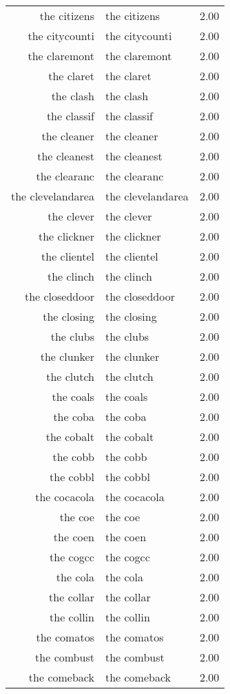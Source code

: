 \begin{table}[ht]
\begin{tabular}{rlr}
  the citizens & the citizens & 2.00 \\ 
  the citycounti & the citycounti & 2.00 \\ 
  the claremont & the claremont & 2.00 \\ 
  the claret & the claret & 2.00 \\ 
  the clash & the clash & 2.00 \\ 
  the classif & the classif & 2.00 \\ 
  the cleaner & the cleaner & 2.00 \\ 
  the cleanest & the cleanest & 2.00 \\ 
  the clearanc & the clearanc & 2.00 \\ 
  the clevelandarea & the clevelandarea & 2.00 \\ 
  the clever & the clever & 2.00 \\ 
  the clickner & the clickner & 2.00 \\ 
  the clientel & the clientel & 2.00 \\ 
  the clinch & the clinch & 2.00 \\ 
  the closeddoor & the closeddoor & 2.00 \\ 
  the closing & the closing & 2.00 \\ 
  the clubs & the clubs & 2.00 \\ 
  the clunker & the clunker & 2.00 \\ 
  the clutch & the clutch & 2.00 \\ 
  the coals & the coals & 2.00 \\ 
  the coba & the coba & 2.00 \\ 
  the cobalt & the cobalt & 2.00 \\ 
  the cobb & the cobb & 2.00 \\ 
  the cobbl & the cobbl & 2.00 \\ 
  the cocacola & the cocacola & 2.00 \\ 
  the coe & the coe & 2.00 \\ 
  the coen & the coen & 2.00 \\ 
  the cogcc & the cogcc & 2.00 \\ 
  the cola & the cola & 2.00 \\ 
  the collar & the collar & 2.00 \\ 
  the collin & the collin & 2.00 \\ 
  the comatos & the comatos & 2.00 \\ 
  the combust & the combust & 2.00 \\ 
  the comeback & the comeback & 2.00 \\ 

\end{tabular}
\end{table}
